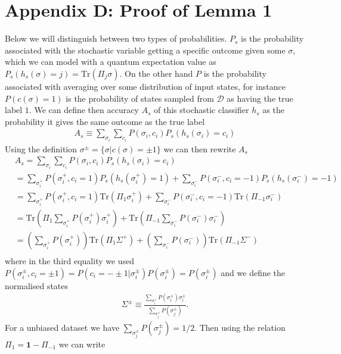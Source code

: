 \documentclass[onecolumn,prx, superscriptaddress,longbibliography,margin=1mm 11pt]{revtex4-2}
\renewcommand{\mathbf}[1]{\boldsymbol{#1}}
\begin{document}
\section*{Appendix D: Proof of Lemma 1}
Below we will distinguish between two types of probabilities. $P_s$ is the probability associated with the stochastic variable getting a specific outcome given some $\sigma$, which we can model with a quantum expectation value as $P_s(h_s(\sigma)=j)=\text{Tr}(\Pi_j \sigma)$. On the other hand $P$ is the probability associated with averaging over some distribution of input states, for instance $P(c(\sigma)=1)$ is the probability of states sampled from $\mathcal{D}$ as having the true label $1$. We can define then accuracy $A_s$ of this stochastic classifier $h_s$ as the probability it gives the same outcome as the true label
\begin{align}
    A_s \equiv \sum_{\sigma_i}\sum_{c_i}P(\sigma_i, c_i)P_s(h_s(\sigma_i)=c_i)
\end{align}
Using the definition $\sigma^{\pm}=\{\sigma| c(\sigma)=\pm 1\}$ we can then rewrite $A_s$ 
\begin{align}
    &A_s= \sum_{\sigma_i}\sum_{c_i}P(\sigma_i, c_i)P_s(h_s(\sigma_i)=c_i) \nonumber \\
    &=\sum_{\sigma_i^+}P(\sigma^+_i, c_i=1)P_s(h_s(\sigma^+_i)=1) +\sum_{\sigma_i^-}P(\sigma^-_i, c_i=-1)P_s(h_s(\sigma^-_i)=-1) \nonumber \\
    &=\sum_{\sigma_i^+}P(\sigma^+_i, c_i=1) \text{Tr}(\Pi_1 \sigma_i^+) +\sum_{\sigma_i^-}P(\sigma^-_i, c_i=-1) \text{Tr}(\Pi_{-1} \sigma_i^-) \nonumber \\
    &=\text{Tr}(\Pi_1\sum_{\sigma_i^+}P(\sigma^+_i)\sigma_i^+) +\text{Tr}(\Pi_{-1}\sum_{\sigma_i^-}P(\sigma^-_i)\sigma_i^-) \nonumber \\
    &=(\sum_{\sigma_i^+}P(\sigma^+_i))\text{Tr}(\Pi_1 \Sigma^+)+(\sum_{\sigma_i^-}P(\sigma^-_i))\text{Tr}(\Pi_{-1}\Sigma^-) \nonumber \\
    &
\end{align}
where in the third equality we used $P(\sigma^{\pm}_i, c_i=\pm 1)=P(c_i=-\pm 1|\sigma^{\pm}_i)P(\sigma^{\pm}_i)=P(\sigma^{\pm}_i)$ and we define the normalised states 
\begin{align}
     \Sigma^{\pm} \equiv \frac{\sum_{\sigma_i^{\pm}}P(\sigma^{\pm}_i)\sigma_i^{\pm}}{\sum_{\sigma_j^{\pm}}P(\sigma^{\pm}_j)}.
\end{align}
For a unbiased dataset we have $\sum_{\sigma_j^{\pm}}P(\sigma^{\pm}_j)=1/2$. 
Then using the relation $\Pi_1=\mathbf{1}-\Pi_{-1}$ we can write 
\end{document}
